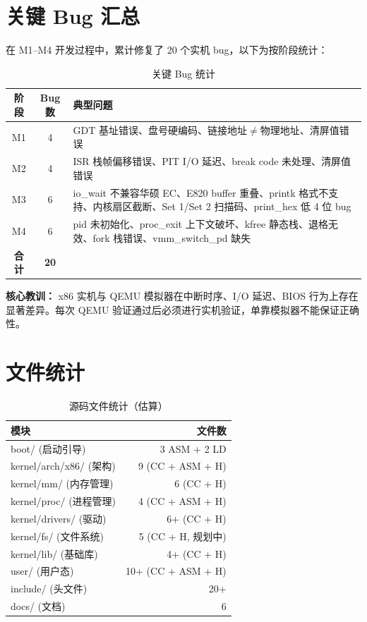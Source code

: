 \documentclass[12pt,a4paper]{article}
\begin{document}
\section{关键 Bug 汇总}

在 M1--M4 开发过程中，累计修复了 20 个实机 bug，以下为按阶段统计：

\begin{table}[h]
\centering
\begin{tabular}{ccp{10cm}}
\toprule
\textbf{阶段} & \textbf{Bug 数} & \textbf{典型问题} \\
\midrule
M1 & 4 & GDT 基址错误、盘号硬编码、链接地址$\neq$物理地址、清屏值错误 \\
M2 & 4 & ISR 栈帧偏移错误、PIT I/O 延迟、break code 未处理、清屏值错误 \\
M3 & 6 & io\_wait 不兼容华硕 EC、E820 buffer 重叠、printk 格式不支持、内核扇区截断、Set 1/Set 2 扫描码、print\_hex 低 4 位 bug \\
M4 & 6 & pid 未初始化、proc\_exit 上下文破坏、kfree 静态栈、退格无效、fork 栈错误、vmm\_switch\_pd 缺失 \\
\midrule
\textbf{合计} & \textbf{20} & \\
\bottomrule
\end{tabular}
\caption{关键 Bug 统计}
\end{table}

\textbf{核心教训：} x86 实机与 QEMU 模拟器在中断时序、I/O 延迟、BIOS 行为上存在显著差异。每次 QEMU 验证通过后必须进行实机验证，单靠模拟器不能保证正确性。

\section{文件统计}

\begin{table}[h]
\centering
\begin{tabular}{lr}
\toprule
\textbf{模块} & \textbf{文件数} \\
\midrule
boot/ (启动引导)    & 3 ASM + 2 LD \\
kernel/arch/x86/ (架构) & 9 (CC + ASM + H) \\
kernel/mm/ (内存管理)   & 6 (CC + H) \\
kernel/proc/ (进程管理) & 4 (CC + ASM + H) \\
kernel/drivers/ (驱动)  & 6+ (CC + H) \\
kernel/fs/ (文件系统)   & 5 (CC + H, 规划中) \\
kernel/lib/ (基础库)    & 4+ (CC + H) \\
user/ (用户态)      & 10+ (CC + ASM + H) \\
include/ (头文件)   & 20+ \\
docs/ (文档)        & 6 \\
\bottomrule
\end{tabular}
\caption{源码文件统计（估算）}
\end{table}
\end{document}
